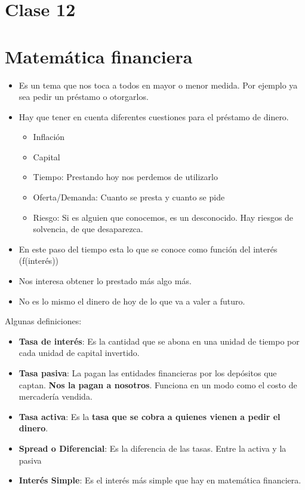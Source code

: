 \documentclass[titlepage,a4paper]{article}
\begin{document}
\newpage
\section*{Clase 12}
\section{Matemática financiera}
\begin{itemize}
\item Es un tema que nos toca a todos en mayor o menor medida. Por ejemplo ya sea pedir un préstamo o otorgarlos.
\item Hay que tener en cuenta diferentes cuestiones para el préstamo de dinero.
    \begin{itemize}
    \item Inflación
    \item Capital
    \item Tiempo: Prestando hoy nos perdemos de utilizarlo
    \item Oferta/Demanda: Cuanto se presta y cuanto se pide
    \item Riesgo: Si es alguien que conocemos, es un desconocido. Hay riesgos de solvencia, de que desaparezca.
    \end{itemize}
\item En este paso del tiempo esta lo que se conoce como función del interés (f(interés))
\item Nos interesa obtener lo prestado más algo más.
\item No es lo mismo el dinero de hoy de lo que va a valer a futuro.
\end{itemize}

\medskip
Algunas definiciones:
\begin{itemize}
\item \textbf{Tasa de interés}: Es la cantidad que se abona en una unidad de tiempo por cada unidad de capital invertido.
\item \textbf{Tasa pasiva}: La pagan las entidades financieras por los depósitos que captan. \textbf{Nos la pagan a nosotros}. Funciona en un modo como el costo de mercadería vendida.
\item \textbf{Tasa activa}: Es la \textbf{tasa que se cobra a quienes vienen a pedir el dinero}.
\item \textbf{Spread o Diferencial}: Es la diferencia de las tasas. Entre la activa y la pasiva
\item \textbf{Interés Simple}: Es el interés más simple que hay en matemática financiera. 
\end{itemize}
\end{document}
